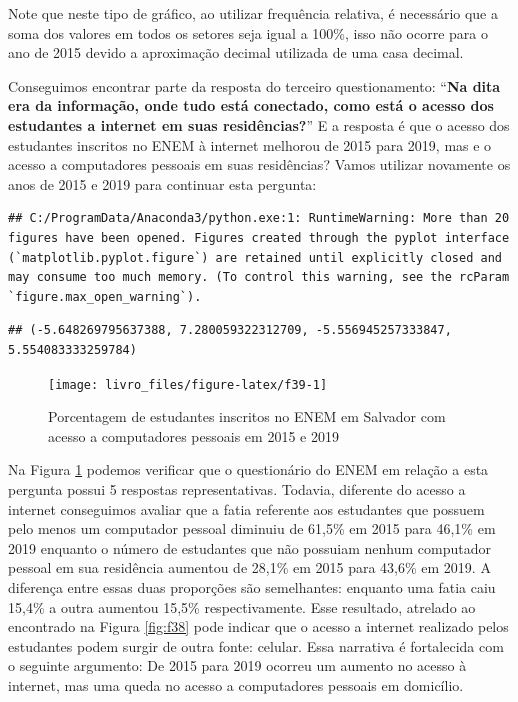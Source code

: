 \documentclass[
  oneside]{book}
\begin{document}
Note que neste tipo de gráfico, ao utilizar frequência relativa, é necessário que a soma dos valores em todos os setores seja igual a 100\%, isso não ocorre para o ano de 2015 devido a aproximação decimal utilizada de uma casa decimal.

Conseguimos encontrar parte da resposta do terceiro questionamento: ``\textbf{Na dita era da informação, onde tudo está conectado, como está o acesso dos estudantes a internet em suas residências?}'' E a resposta é que o acesso dos estudantes inscritos no ENEM à internet melhorou de 2015 para 2019, mas e o acesso a computadores pessoais em suas residências? Vamos utilizar novamente os anos de 2015 e 2019 para continuar esta pergunta:

\begin{verbatim}
## C:/ProgramData/Anaconda3/python.exe:1: RuntimeWarning: More than 20 figures have been opened. Figures created through the pyplot interface (`matplotlib.pyplot.figure`) are retained until explicitly closed and may consume too much memory. (To control this warning, see the rcParam `figure.max_open_warning`).
\end{verbatim}

\begin{verbatim}
## (-5.648269795637388, 7.280059322312709, -5.556945257333847, 5.554083333259784)
\end{verbatim}

\begin{figure}

{\centering \texttt{[image: livro\_files/figure-latex/f39-1]} 

}

\caption{Porcentagem de estudantes inscritos no ENEM em Salvador com acesso a computadores pessoais em 2015 e 2019}\label{fig:f39}
\end{figure}

Na Figura \ref{fig:f39} podemos verificar que o questionário do ENEM em relação a esta pergunta possui 5 respostas representativas. Todavia, diferente do acesso a internet conseguimos avaliar que a fatia referente aos estudantes que possuem pelo menos um computador pessoal diminuiu de 61,5\% em 2015 para 46,1\% em 2019 enquanto o número de estudantes que não possuiam nenhum computador pessoal em sua residência aumentou de 28,1\% em 2015 para 43,6\% em 2019. A diferença entre essas duas proporções são semelhantes: enquanto uma fatia caiu 15,4\% a outra aumentou 15,5\% respectivamente. Esse resultado, atrelado ao encontrado na Figura \ref{fig:f38} pode indicar que o acesso a internet realizado pelos estudantes podem surgir de outra fonte: celular. Essa narrativa é fortalecida com o seguinte argumento: De 2015 para 2019 ocorreu um aumento no acesso à internet, mas uma queda no acesso a computadores pessoais em domicílio.
\end{document}
